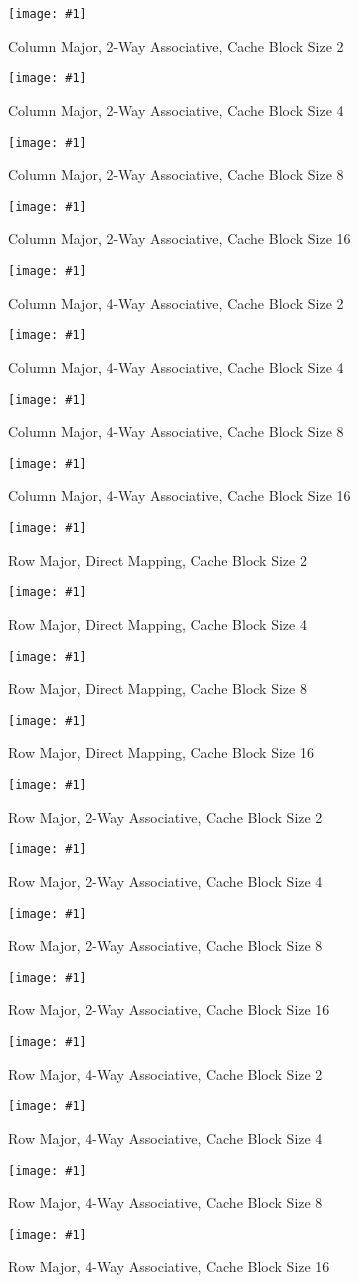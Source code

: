 \documentclass[11pt,a4paper]{article}
\newcommand{\cacheResultFigure}[3]{
\begin{figure}
	\centering
	\texttt{[image: \#1]}
	\caption{#2}
	\label{#3}
\end{figure}
}
\begin{document}
\cacheResultFigure{pictures/task4_columnMajor_2waySetAssociative2}{Column Major, 2-Way Associative, Cache Block Size 2}{fig:pic5}
\cacheResultFigure{pictures/task4_columnMajor_2waySetAssociative4}{Column Major, 2-Way Associative, Cache Block Size 4}{fig:pic6}
\cacheResultFigure{pictures/task4_columnMajor_2waySetAssociative8}{Column Major, 2-Way Associative, Cache Block Size 8}{fig:pic7}
\cacheResultFigure{pictures/task4_columnMajor_2waySetAssociative16}{Column Major, 2-Way Associative, Cache Block Size 16}{fig:pic8}

\cacheResultFigure{pictures/task4_columnMajor_4waySetAssociative2}{Column Major, 4-Way Associative, Cache Block Size 2}{fig:pic9}
\cacheResultFigure{pictures/task4_columnMajor_4waySetAssociative4}{Column Major, 4-Way Associative, Cache Block Size 4}{fig:pic10}
\cacheResultFigure{pictures/task4_columnMajor_4waySetAssociative8}{Column Major, 4-Way Associative, Cache Block Size 8}{fig:pic11}
\cacheResultFigure{pictures/task4_columnMajor_4waySetAssociative16}{Column Major, 4-Way Associative, Cache Block Size 16}{fig:pic12}


\cacheResultFigure{pictures/task4_rowMajor_directMapping2}{Row Major, Direct Mapping, Cache Block Size 2}{fig:pic13}
\cacheResultFigure{pictures/task4_rowMajor_directMapping4}{Row Major, Direct Mapping, Cache Block Size 4}{fig:pic14}
\cacheResultFigure{pictures/task4_rowMajor_directMapping8}{Row Major, Direct Mapping, Cache Block Size 8}{fig:pic15}
\cacheResultFigure{pictures/task4_rowMajor_directMapping16}{Row Major, Direct Mapping, Cache Block Size 16}{fig:pic16}

\cacheResultFigure{pictures/task4_rowMajor_2waySetAssociative2}{Row Major, 2-Way Associative, Cache Block Size 2}{fig:pic17}
\cacheResultFigure{pictures/task4_rowMajor_2waySetAssociative4}{Row Major, 2-Way Associative, Cache Block Size 4}{fig:pic18}
\cacheResultFigure{pictures/task4_rowMajor_2waySetAssociative8}{Row Major, 2-Way Associative, Cache Block Size 8}{fig:pic19}
\cacheResultFigure{pictures/task4_rowMajor_2waySetAssociative16}{Row Major, 2-Way Associative, Cache Block Size 16}{fig:pic20}

\cacheResultFigure{pictures/task4_rowMajor_4waySetAssociative2}{Row Major, 4-Way Associative, Cache Block Size 2}{fig:pic21}
\cacheResultFigure{pictures/task4_rowMajor_4waySetAssociative4}{Row Major, 4-Way Associative, Cache Block Size 4}{fig:pic22}
\cacheResultFigure{pictures/task4_rowMajor_4waySetAssociative8}{Row Major, 4-Way Associative, Cache Block Size 8}{fig:pic23}
\cacheResultFigure{pictures/task4_rowMajor_4waySetAssociative16}{Row Major, 4-Way Associative, Cache Block Size 16}{fig:pic24}






\newpage
\nocite{*}
\printbibliography

\end{document}
